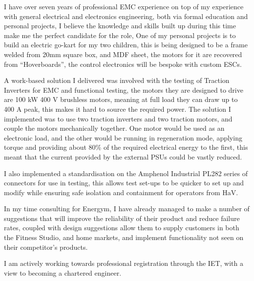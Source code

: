 \begin{multicols}{2} %
\begin{dolines}
	
I have over seven years of professional EMC experience on top of my experience with general electrical and electronics engineering, both via formal education and personal projects, I believe the knowledge and skills built up during this time make me the perfect candidate for the role, One of my personal projects is to build an electric go-kart for my two children, this is being designed to be a frame welded from 20mm square box, and MDF sheet, the motors for it are recovered from “Hoverboards”, the control electronics will be bespoke with custom ESCs.

A work-based solution I delivered was involved with the testing of Traction Inverters for EMC and functional testing, the motors they are designed to drive are 100 kW 400 V brushless motors, meaning at full load they can draw up to 400 A peak, this makes it hard to source the required power. The solution I implemented was to use two traction inverters and two traction motors, and couple the motors mechanically together. One motor would be used as an electronic load, and the other would be running in regeneration mode, applying torque and providing about 80\% of the required electrical energy to the first, this meant that the current provided by the external PSUs could be vastly reduced.

I also implemented a standardisation on the Amphenol Industrial PL282 series of connectors for use in testing, this allows test set-ups to be quicker to set up and modify while ensuring safe isolation and containment for operators from HaV.

In my time consulting for Energym, I have already managed to make a number of suggestions that will improve the reliability of their product and reduce failure rates, coupled with design suggestions allow them to supply customers in both the Fitness Studio, and home markets, and implement functionality not seen on their competitor's products.

I am actively working towards professional registration through the IET, with a view to becoming a chartered engineer.

\end{dolines}
\end{multicols}